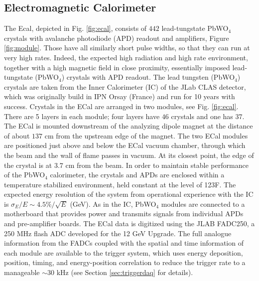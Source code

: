 \subsection{Electromagnetic Calorimeter} 
\label{sec:ecal}

The Ecal, depicted in Fig. \ref{fig:ecal}, consists of $442$ lead-tungstate PbWO$_4$ crystals with avalanche photodiode (APD) readout and amplifiers, Figure \ref{fig:module}. Those have all similarly short pulse widths, so that they can run at very high rates. Indeed, the expected high radiation and high rate environment, together with a high magnetic field in close proximity, essentially imposed lead-tungstate (PbWO$_4$) crystals with APD readout. The lead tungsten (PbWO$_4$) crystals are taken from the Inner Calorimeter (IC) of the JLab CLAS detector, which was originally build in IPN Orsay (France) and run for 10 years with success. Crystals in the ECal are arranged in two modules, see Fig. \ref{fig:ecal}. There are 5 layers in each module; four layers have $46$ crystals and one has $37$. The ECal is mounted downstream of the analyzing dipole magnet at the distance of about $137$ cm from the upstream edge of the magnet. The two ECal modules are positioned just above and below the ECal vacuum chamber, through which the beam and the wall of flame passes in vacuum. At its closest point, the edge of the crystal is at $3.7$ cm from the beam. In order to maintain stable performance of the PbWO$_4$ calorimeter, the crystals and APDs are enclosed within a temperature stabilized environment, held constant at the level of 1\!\char23F. The expected energy resolution of the system from operational experience with the IC is $\sigma_E/E \sim 4.5\%/\sqrt{E}$ (GeV). As in the IC, PbWO$_4$ modules are connected to a motherboard that provides power and transmits signals from individual APDs and pre-amplifier boards. The ECal data is digitized using the JLAB FADC250, a 250 MHz flash ADC developed for the 12 GeV Upgrade. The full analogue information from the FADCs coupled with the spatial and time information of each module are available to the trigger system, which uses energy deposition, position, timing, and energy-position correlation to reduce the trigger rate to a manageable $\sim 30$ kHz (see Section \ref{sec:triggerdaq} for details).


